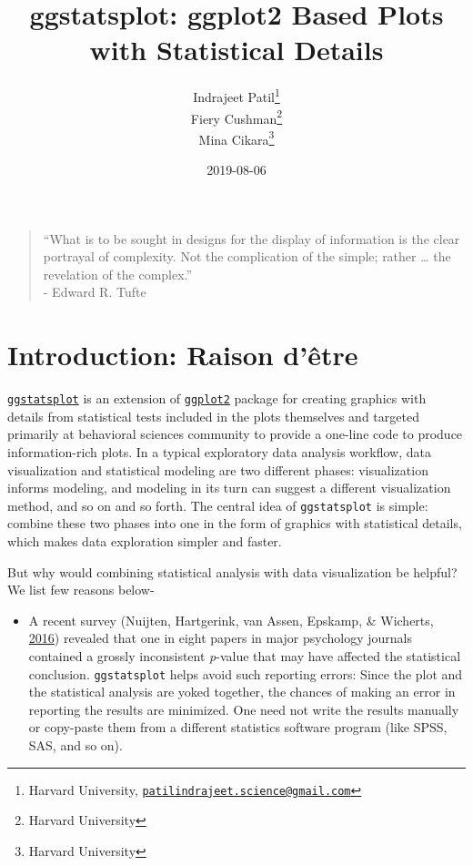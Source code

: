 \documentclass[]{article}
\title{ggstatsplot: ggplot2 Based Plots with Statistical Details}
\author{Indrajeet Patil\footnote{Harvard University, \href{mailto:patilindrajeet.science@gmail.com}{\nolinkurl{patilindrajeet.science@gmail.com}}} \\ Fiery Cushman\footnote{Harvard University} \\ Mina Cikara\footnote{Harvard University}}
\date{2019-08-06}
\providecommand{\tightlist}{%
  \setlength{\itemsep}{0pt}\setlength{\parskip}{0pt}}
\begin{document}
\maketitle

{
\hypersetup{linkcolor=black}
\setcounter{tocdepth}{2}
\tableofcontents
}
\begin{quote}
``What is to be sought in designs for the display of information is the clear
portrayal of complexity. Not the complication of the simple; rather \ldots{} the
revelation of the complex.''\\
- Edward R. Tufte
\end{quote}

\hypertarget{introduction-raison-detre}{%
\section{Introduction: Raison d'être}\label{introduction-raison-detre}}

\href{https://indrajeetpatil.github.io/ggstatsplot/}{\texttt{ggstatsplot}} is an extension
of \href{https://github.com/tidyverse/ggplot2}{\texttt{ggplot2}} package for creating
graphics with details from statistical tests included in the plots themselves
and targeted primarily at behavioral sciences community to provide a one-line
code to produce information-rich plots. In a typical exploratory data analysis
workflow, data visualization and statistical modeling are two different phases:
visualization informs modeling, and modeling in its turn can suggest a
different visualization method, and so on and so forth. The central idea of
\texttt{ggstatsplot} is simple: combine these two phases into one in the form of
graphics with statistical details, which makes data exploration simpler and
faster.

But why would combining statistical analysis with data visualization be helpful?
We list few reasons below-

\begin{itemize}
\tightlist
\item
  A recent survey (Nuijten, Hartgerink, van Assen, Epskamp, \& Wicherts, \protect\hyperlink{ref-nuijtenPrevalenceStatisticalReporting2016}{2016}) revealed that
  one in eight papers in major psychology journals contained a grossly
  inconsistent \emph{p}-value that may have affected the statistical conclusion.
  \texttt{ggstatsplot} helps avoid such reporting errors: Since the plot and the
  statistical analysis are yoked together, the chances of making an error in
  reporting the results are minimized. One need not write the results manually
  or copy-paste them from a different statistics software program (like SPSS,
  SAS, and so on).
\end{itemize}
\end{document}
